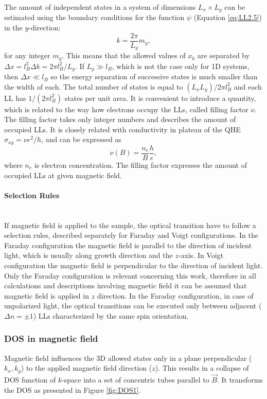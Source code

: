 \documentclass[titlepage,a4paper]{book}
\newcommand{\wciecie}{\quad\phantom{v}}
\newcommand{\myparagraph}[1]{\paragraph{#1}\mbox{}\\}
\begin{document}
The amount of independent states in a system of dimensions $L_x \times L_y$ can be estimated using the boundary conditions for the function $\psi$ (Equation \ref{eq:LL2.5}) in the $y$-direction:
\begin{equation}
\label{eq:LL5}
k = \frac{2\pi}{L_y}m_y,
\end{equation}
for any integer $m_y$. This means that the allowed values of $x_k$ are separated by $\Delta x = l_B^2 \Delta k = 2\pi l_B^2/L_y$. If $L_y \gg l_B$, which is not the case only for 1D systems, then $\Delta x \ll l_B$ so the energy separation of successive states is much smaller than the width of each. The total number of states is equal to $(L_x L_y)/2\pi l_B^2$ and each LL has $1/(2\pi l_B^2)$ states per unit area. It is convenient to introduce a quantity, which is related to the way how electrons occupy the LLs, called filling factor $\nu$. The filling factor takes only integer numbers and describes the amount of occupied LLs. It is closely related with conductivity in plateau of the QHE $\sigma_{xy} = \nu e^2/h$, and can be expressed as
\begin{equation}
\label{eq:FillingFactor}
\nu (B) = \frac{n_e}{B}\frac{h}{e},
\end{equation}
where $n_e$ is electron concentration. The filling factor expresses the amount of occupied LLs at given magnetic field.

\myparagraph{Selection Rules}
\wciecie
If magnetic field is applied to the sample, the optical transition have to follow a selection rules, described separately for Faraday and Voigt configurations. In the Faraday configuration the magnetic field is parallel to the direction of incident light, which is usually along growth direction and the $z$-axis. In Voigt configuration the magnetic field is perpendicular to the direction of incident light. Only the Faraday configuration is relevant concerning this work, therefore in all calculations and descriptions involving magnetic field it can be assumed that magnetic field is applied in $z$ direction. In the Faraday configuration, in case of unpolarized light, the optical transitions can be executed only between adjacent ($\Delta n = \pm 1$) LLs characterized by the same spin orientation.

\subsubsection{DOS in magnetic field}
\wciecie
Magnetic field influences the 3D allowed states only in a plane perpendicular ($k_x,k_y$) to the applied magnetic field direction ($z$). This results in a collapse of DOS function of $k$-space into a set of concentric tubes parallel to $\vec{B}$. It transforms the DOS as presented in Figure \ref{fig:DOS1}. 
\end{document}
